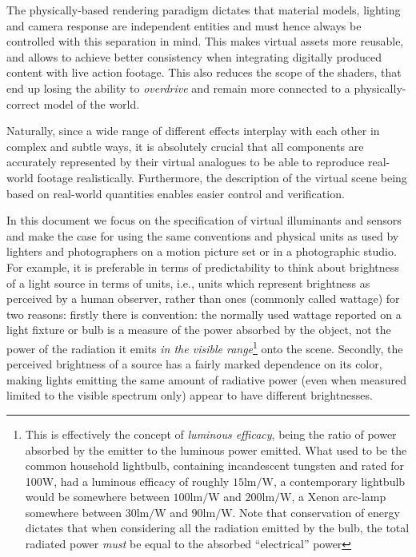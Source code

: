 The physically-based rendering paradigm dictates that \glspl{material model},
lighting and camera response are independent entities and
must hence always be controlled with this separation in mind. 
This makes \gls{virtual} assets more reusable, 
and allows to achieve better consistency when integrating 
digitally produced content with live action \gls{footage}.
This also reduces the scope of the shaders, that end up losing the ability
to \emph{overdrive} and remain more connected to a physically-correct 
model of the world.

Naturally, since a wide range of different effects interplay with each
other in complex and subtle ways, it is absolutely crucial that all
components are accurately represented by their virtual analogues to be
able to reproduce real-world footage realistically. 
Furthermore, the description of the \gls{virtual scene} being based on
real-world quantities enables easier control and verification.




In this document we focus on the specification of \gls{virtual} \glspl{illuminant} and
\glspl{sensor} and make the case for using the same conventions and physical units as
used by lighters and photographers on a motion picture set or in a photographic studio. 
For example, it is preferable in terms of predictability to think about brightness of a 
light source in terms of  units, i.e., units which represent brightness as
perceived by a \gls{human observer}, rather than  ones 
(commonly called \gls{wattage}) for two reasons: 
firstly there is convention: the normally used wattage reported on a light fixture or bulb 
is a measure of the power absorbed by the object, not the power of the radiation it emits 
\emph{in the visible range}\footnote{This is effectively the concept of  
	\textsl{\gls{luminous efficacy}}, being the ratio of power absorbed by the emitter
	to the luminous power emitted. 
	What used to be the common household lightbulb, containing incandescent tungsten and 
	rated for 100W, had a luminous efficacy of roughly $15\unit{\lumen\per\watt}$, 
	a contemporary  lightbulb would be somewhere between 
	$100\unit{\lumen\per\watt}$ and $200\unit{\lumen\per\watt}$, 
	a Xenon arc-lamp somewhere between $30\unit{\lumen\per\watt}$ and
	$90\unit{\lumen\per\watt}$. 
	Note that conservation of energy dictates that when considering all the
	radiation emitted by the bulb, the total radiated power \emph{must} be equal 
	to the absorbed ``electrical'' power} onto the \gls{scene}. 
Secondly, the perceived \gls{brightness} of a source has a fairly marked dependence on 
its color, making lights emitting the same amount of radiative power (even when measured 
limited to the visible spectrum only) appear to have different brightnesses. 

